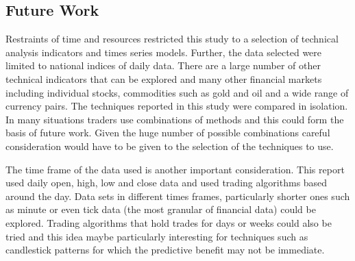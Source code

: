 \subsection{Future Work}
Restraints of time and resources restricted this study to a selection of technical analysis indicators and times series models. Further, the data selected were limited to national indices of daily data. There are a large number of other technical indicators that can be explored and many other financial markets including individual stocks, commodities such as gold and oil and a wide range of currency pairs. The techniques reported in this study were compared in isolation. In many situations traders use combinations of methods and this could form the basis of future work. Given the huge number of possible combinations careful consideration would have to be given to the selection of the techniques to use.

The time frame of the data used is another important consideration. This report used daily open, high, low and close data and used trading algorithms based around the day. Data sets in different times frames, particularly shorter ones such as minute or even tick data (the most granular of financial data) could be explored. Trading algorithms that hold trades for days or weeks could also be tried and this idea maybe particularly interesting for techniques such as candlestick patterns for which the predictive benefit may not be immediate.
